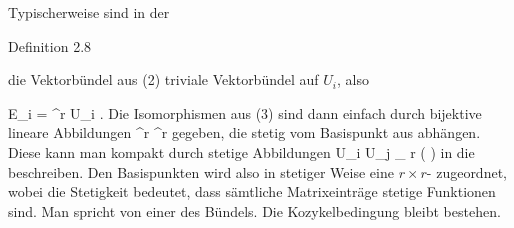 {}
{





Typischerweise sind in der

Definition 2.8

die Vektorbündel aus (2) triviale Vektorbündel auf $U_i$, also

\mavergleichskette
{\vergleichskette
{E_i
}
{ = }{ \R^r \times U_i
}
{  }{
}
{    }{
}
{   }{
}
}
{}{}{.}
Die Isomorphismen aus (3) sind dann einfach durch bijektive lineare Abbildungen
 { \R^r} { \R^r
} {}
gegeben, die stetig vom Basispunkt aus
 abhängen. Diese kann man kompakt durch stetige Abbildungen
 {U_i \cap U_j } { _{  r   } \! \left(  \R  \right)
} {}
in die
beschreiben. Den Basispunkten wird also in stetiger Weise eine
$r \times r$-
zugeordnet, wobei die Stetigkeit bedeutet, dass sämtliche Matrixeinträge stetige Funktionen sind. Man spricht von einer  {} des Bündels. Die Kozykelbedingung bleibt bestehen.





}





